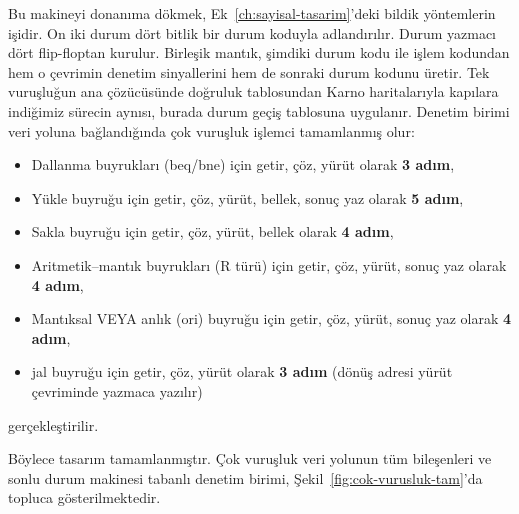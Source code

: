 Bu makineyi donanıma dökmek, Ek~\ref{ch:sayisal-tasarim}'deki bildik yöntemlerin işidir. On iki durum dört bitlik bir durum koduyla adlandırılır. Durum yazmacı dört flip-floptan kurulur. Birleşik mantık, şimdiki durum kodu ile işlem kodundan hem o çevrimin denetim sinyallerini hem de sonraki durum kodunu üretir. Tek vuruşluğun ana çözücüsünde doğruluk tablosundan Karno haritalarıyla kapılara indiğimiz sürecin aynısı, burada durum geçiş tablosuna uygulanır. Denetim birimi veri yoluna bağlandığında çok vuruşluk işlemci tamamlanmış olur:
\begin{itemize}
    \item Dallanma buyrukları (beq/bne) için getir, çöz, yürüt olarak \textbf{3 adım},
    \item Yükle buyruğu için getir, çöz, yürüt, bellek, sonuç yaz olarak \textbf{5 adım},
    \item Sakla buyruğu için getir, çöz, yürüt, bellek olarak \textbf{4 adım},
    \item Aritmetik--mantık buyrukları (R türü) için getir, çöz, yürüt, sonuç yaz olarak \textbf{4 adım},
    \item Mantıksal VEYA anlık (ori) buyruğu için getir, çöz, yürüt, sonuç yaz olarak \textbf{4 adım},
    \item jal buyruğu için getir, çöz, yürüt olarak \textbf{3 adım} (dönüş adresi yürüt çevriminde yazmaca yazılır)
\end{itemize}
gerçekleştirilir.

Böylece tasarım tamamlanmıştır. Çok vuruşluk veri yolunun tüm bileşenleri ve sonlu durum makinesi tabanlı denetim birimi, Şekil~\ref{fig:cok-vurusluk-tam}'da topluca gösterilmektedir.

